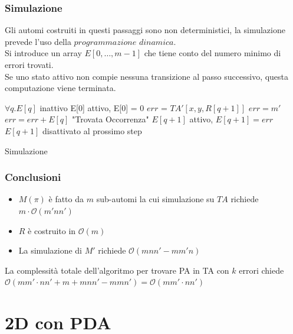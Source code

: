 \documentclass{beamer}
\newcommand{\bigO}{\ensuremath{\mathcal{O}}} %
\begin{document}
\begin{frame}
\frametitle{Simulazione}
Gli automi costruiti in questi passaggi sono non deterministici, la simulazione prevede l'uso della $programmazione$ $dinamica$.\\
Si introduce un array $E[0,\dots, m-1]$ che tiene conto del numero minimo di errori trovati.\\
Se uno stato attivo non compie nessuna transizione al passo successivo, questa computazione viene terminata.
\end{frame}


\begin{frame}

\begin{algorithm}[H]
\begin{algorithmic}[1]
  \scriptsize
{}
\STATE $\forall q . E[q]$ inattivo
		\STATE E[0] attivo, E[0] = 0
			\STATE $err$ = $TA'[x,y,R[q+1]]$
			 \STATE $err = m'$ \ENDIF
			\STATE $err = err + E[q]$
				 \STATE "Trovata Occorrenza"
				\ELSE \STATE $E[q+1]$ attivo, $E[q+1] = err$
				\ENDIF
			\ELSE \STATE $E[q+1]$ disattivato al prossimo step
			\ENDIF
		\ENDFOR
	\ENDFOR
\ENDFOR


\end{algorithmic}
\caption{Simulazione}
\end{algorithm}

\end{frame}

\begin{frame}
\frametitle{Conclusioni}

\begin{itemize}
\item $M(\pi)$ è fatto da $m$ sub-automi la cui simulazione su $TA$ richiede $m \cdot \bigO{(m'nn')}$
\item $R$ è costruito in $\bigO{(m)}$ 
\item La simulazione di $M'$ richiede $\bigO{(mnn' - mm'n)}$
\end{itemize}
La complessità totale dell'algoritmo per trovare PA in TA con $k$ errori chiede $\bigO{(mm' \cdot nn' + m +mnn' - mmn')} = \bigO{(mm' \cdot nn')}$

\end{frame}

\section{2D con PDA}
\end{document}
